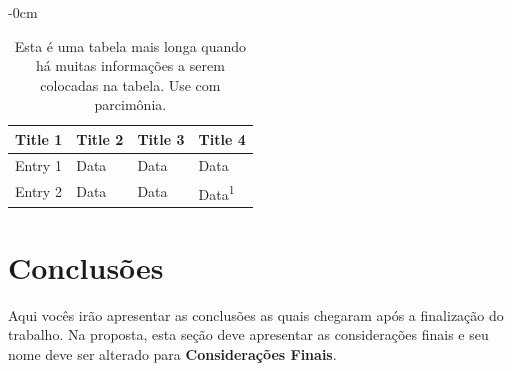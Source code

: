 \documentclass[article,submit,moreauthors,pdftex]{Definitions/mdpi}
\begin{document}
	\begin{table}[H]
		\caption{Esta é uma tabela mais longa quando há muitas informações a serem colocadas na tabela. Use com parcimônia.\label{tab2}}
		\begin{adjustwidth}{-\extralength}{0cm}
			\begin{tabularx}{\fulllength}{CCCC}
				\toprule
				\textbf{Title 1}	& \textbf{Title 2}	& \textbf{Title 3}     & \textbf{Title 4}\\
				\midrule
				Entry 1		& Data			& Data			& Data\\
				Entry 2		& Data			& Data			& Data\textsuperscript{1}\\
				\bottomrule
			\end{tabularx}
		\end{adjustwidth}
	\end{table}
	
	\section{Conclusões}
	
	Aqui vocês irão apresentar as conclusões as quais chegaram após a finalização do trabalho. Na proposta, esta seção deve apresentar as considerações finais e seu nome deve ser alterado para \textbf{Considerações Finais}.
	
	\vspace{6pt} 
	
	
\end{document}
